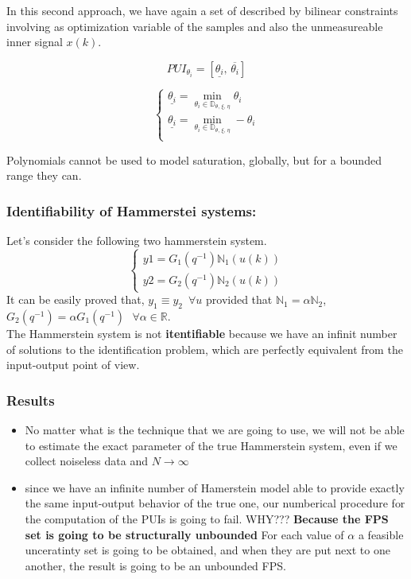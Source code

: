 In this second approach, we have again a set of described by bilinear constraints involving as optimization variable of the samples and also the unmeasureable inner signal $x(k)$.

\[
PUI_{\theta_i} = [\underline{\theta_i},\,\overline{\theta_i}]
\]

\[
\begin{cases}
\underline{\theta_i} = \min \limits_{\theta_i \in \mathbb{\mathbb{D}_{\theta,\,\xi,\,\eta}}} \theta_i\\
\underline{\theta_i} = \min \limits_{\theta_i \in \mathbb{\mathbb{D}_{\theta,\,\xi,\,\eta}}} -\theta_i\\
\end{cases}
\]
\begin{QandAbox}
Polynomials cannot be used to model saturation, globally, but for a bounded range they can. 
\end{QandAbox}

\subsubsection{Identifiability of Hammerstei systems:}
Let's consider the following two hammerstein system.
\[
\begin{cases}
y1 = G_1(q^{-1})\mathbb{N}_1(u(k))\\
y2 = G_2(q^{-1})\mathbb{N}_2(u(k))
\end{cases}
\]
It can be easily proved that, $y_1 \equiv y_2\,\,\,\forall u$ provided that $\mathbb{N}_1 = \alpha \mathbb{N}_2$, $G_2(q^{-1}) = \alpha G_1(q^{-1}) \:\:\:\forall \alpha \in \mathbb{R}$.\\

The Hammerstein system is not \textbf{itentifiable} because we have an infinit number of solutions to the identification problem, which are perfectly equivalent from the input-output point of view.\\

\subsubsection{Results}
\begin{itemize}
    \item No matter what is the technique that we are going to use, we will not be able to estimate the exact parameter of the true Hammerstein system, even if we collect noiseless data and $N \to \infty$
    \item since we have an infinite number of Hamerstein model able to provide exactly the same input-output behavior of the true one, our numberical procedure for the computation of the PUIs is going to fail. WHY???  \textbf{Because the FPS set is going to be structurally unbounded} For each value of $\alpha$ a feasible unceratinty set is going to be obtained, and when they are put next to one another, the result is going to be an unbounded FPS.
\end{itemize}

